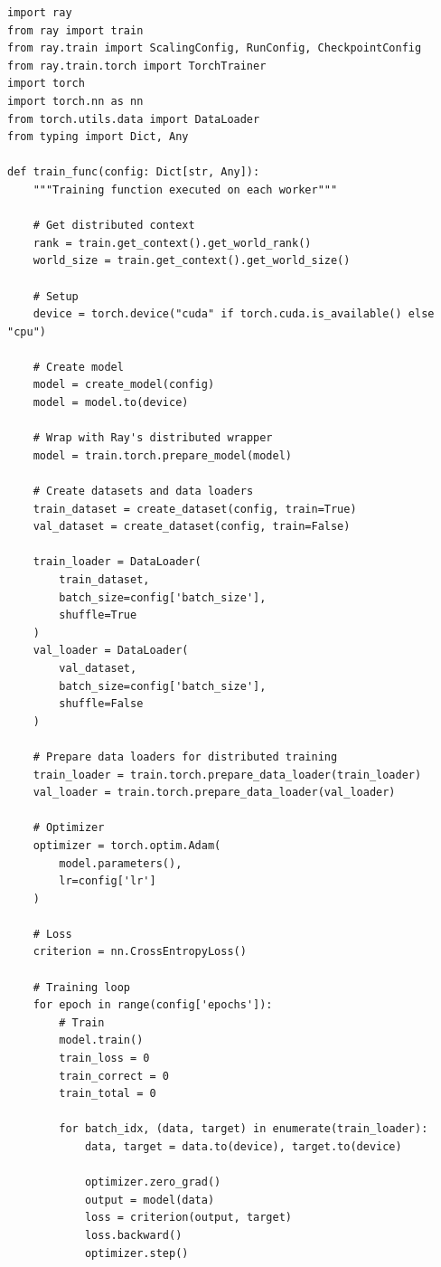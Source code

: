 \begin{lstlisting}[style=python, caption=Distributed Training with Ray Train]
import ray
from ray import train
from ray.train import ScalingConfig, RunConfig, CheckpointConfig
from ray.train.torch import TorchTrainer
import torch
import torch.nn as nn
from torch.utils.data import DataLoader
from typing import Dict, Any

def train_func(config: Dict[str, Any]):
    """Training function executed on each worker"""

    # Get distributed context
    rank = train.get_context().get_world_rank()
    world_size = train.get_context().get_world_size()

    # Setup
    device = torch.device("cuda" if torch.cuda.is_available() else "cpu")

    # Create model
    model = create_model(config)
    model = model.to(device)

    # Wrap with Ray's distributed wrapper
    model = train.torch.prepare_model(model)

    # Create datasets and data loaders
    train_dataset = create_dataset(config, train=True)
    val_dataset = create_dataset(config, train=False)

    train_loader = DataLoader(
        train_dataset,
        batch_size=config['batch_size'],
        shuffle=True
    )
    val_loader = DataLoader(
        val_dataset,
        batch_size=config['batch_size'],
        shuffle=False
    )

    # Prepare data loaders for distributed training
    train_loader = train.torch.prepare_data_loader(train_loader)
    val_loader = train.torch.prepare_data_loader(val_loader)

    # Optimizer
    optimizer = torch.optim.Adam(
        model.parameters(),
        lr=config['lr']
    )

    # Loss
    criterion = nn.CrossEntropyLoss()

    # Training loop
    for epoch in range(config['epochs']):
        # Train
        model.train()
        train_loss = 0
        train_correct = 0
        train_total = 0

        for batch_idx, (data, target) in enumerate(train_loader):
            data, target = data.to(device), target.to(device)

            optimizer.zero_grad()
            output = model(data)
            loss = criterion(output, target)
            loss.backward()
            optimizer.step()


\end{lstlisting}
